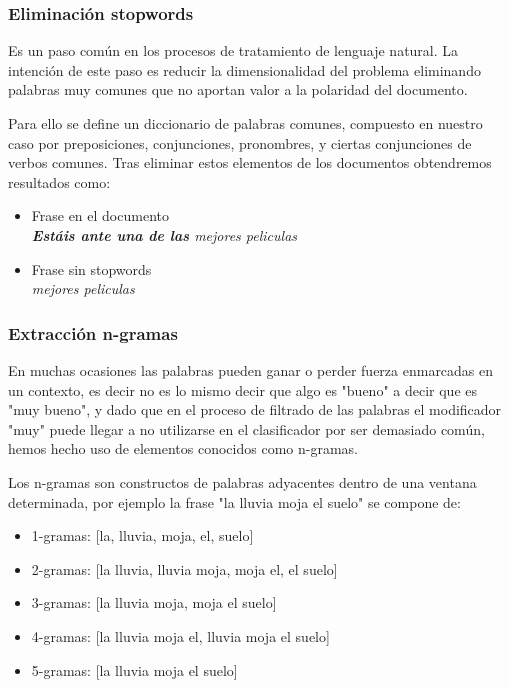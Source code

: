\subsubsection{Eliminación stopwords}

Es un paso común en los procesos de tratamiento de lenguaje natural. La intención de este paso es reducir la dimensionalidad del problema eliminando palabras muy comunes que no aportan valor a la polaridad del documento.

Para ello se define un diccionario de palabras comunes, compuesto en nuestro caso por preposiciones, conjunciones, pronombres, y ciertas conjunciones de verbos comunes. Tras eliminar estos elementos de los documentos obtendremos resultados como:

\begin{itemize}
	\item Frase en el documento \\
		\textit{ \textbf{Estáis ante una de las} mejores peliculas }
	\item Frase sin stopwords \\
		\textit{ mejores peliculas }
\end{itemize}

\subsubsection{Extracción n-gramas}

En muchas ocasiones las palabras pueden ganar o perder fuerza enmarcadas en un contexto, es decir no es lo mismo decir que algo es "bueno" a decir que es "muy bueno", y dado que en el proceso de filtrado de las palabras el modificador "muy" puede llegar a no utilizarse en el clasificador por ser demasiado común, hemos hecho uso de elementos conocidos como n-gramas.

Los n-gramas son constructos de palabras adyacentes dentro de una ventana determinada, por ejemplo la frase "la lluvia moja el suelo" se compone de:

\begin{itemize}
	\item 1-gramas: [la, lluvia, moja, el, suelo]
	\item 2-gramas: [la lluvia, lluvia moja, moja el, el suelo]
	\item 3-gramas: [la lluvia moja, moja el suelo]
	\item 4-gramas: [la lluvia moja el, lluvia moja el suelo]
	\item 5-gramas: [la lluvia moja el suelo]
\end{itemize}

